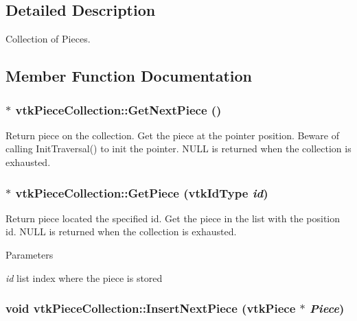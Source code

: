 \subsection{Detailed Description}
Collection of Pieces. 

\subsection{Member Function Documentation}
\hypertarget{classvtkPieceCollection_ae40adc69656f67b99b9e1fe07f94ad04}{
\subsubsection[{GetNextPiece}]{ $\ast$ vtkPieceCollection::GetNextPiece ()}}
\label{classvtkPieceCollection_ae40adc69656f67b99b9e1fe07f94ad04}


Return piece on the collection. Get the piece at the pointer position. Beware of calling InitTraversal() to init the pointer. NULL is returned when the collection is exhausted. \hypertarget{classvtkPieceCollection_a4e0569b11db93fd143cd2200529f41b7}{
\subsubsection[{GetPiece}]{ $\ast$ vtkPieceCollection::GetPiece (vtkIdType {\em id})}}
\label{classvtkPieceCollection_a4e0569b11db93fd143cd2200529f41b7}


Return piece located the specified id. Get the piece in the list with the position id. NULL is returned when the collection is exhausted. 
\begin{DoxyParams}{Parameters}
\item[{\em id}]list index where the piece is stored \end{DoxyParams}
\hypertarget{classvtkPieceCollection_a6f37b0535d1a952beaa969000f857f24}{
\subsubsection[{InsertNextPiece}]{\setlength{\rightskip}{0pt plus 5cm}void vtkPieceCollection::InsertNextPiece ({\bf vtkPiece} $\ast$ {\em Piece})}}
\label{classvtkPieceCollection_a6f37b0535d1a952beaa969000f857f24}


